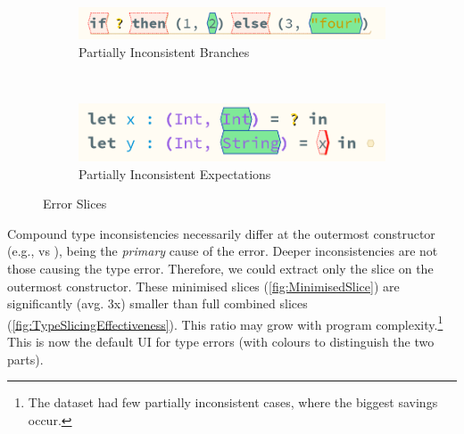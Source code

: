 \begin{figure}[h]
\begin{subfigure}{0.45\textwidth}
\centering

\includegraphics[width=1\textwidth]{Media/Figures/partially_inconsistent_branches}
\caption{Partially Inconsistent Branches}
\end{subfigure}$\qquad$
\begin{subfigure}{0.45\textwidth}
\centering

\includegraphics[width=1\textwidth]{Media/Figures/partially_inconsistent_expectations}
\caption{Partially Inconsistent Expectations}
\end{subfigure}

\caption{Error Slices}
\label{fig:ErrorSlice}
\end{figure}

Compound type inconsistencies necessarily differ at the outermost constructor (e.g.,  vs ), being the \textit{primary} cause of the error. Deeper inconsistencies are not those causing the type error. Therefore, we could extract only the slice on the outermost constructor. These minimised slices (\cref{fig:MinimisedSlice}) are significantly (avg. 3x) smaller than full combined slices (\cref{fig:TypeSlicingEffectiveness}). This ratio may grow with program complexity.\footnote{The dataset had few partially inconsistent cases, where the biggest savings occur.} This is now the default UI for type errors (with colours to distinguish the two parts).


